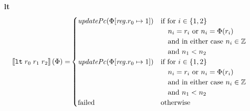 \documentclass[a4paper]{article}
\newcommand{\sem}[1]{\left\llbracket #1 \right\rrbracket}
\newcommand{\targetcolor}[1]{\color{black}}
\newcommand{\trg}[1]{{\targetcolor{} #1}}
\newcommand{\zinstr}[1]{\texttt{#1}}
\newcommand{\threeinstr}[4]{
  \ifthenelse{\equal{#2#3#4}{}}
  {\zinstr{#1}}
  {\zinstr{#1} \; #2 \; #3 \; #4}
}
\newcommand{\tlt}[3]{\threeinstr{\trg{lt}}{#1}{#2}{#3}}
\newcommand{\ints}{\mathbb{Z}}
\newcommand{\update}[2]{[#1 \mapsto #2]}
\newcommand{\updReg}[2]{\update{\reg.#1}{#2}}
\newcommand{\failed}{\mathrm{failed}}
\newcommand{\var}[1]{\mathit{#1}}
\newcommand{\reg}{\var{reg}}
\newcommand{\plainfun}[2]{
  \ifthenelse{\equal{#2}{}}
  {\mathit{#1}}
  {\mathit{#1}(#2)}
}
\newcommand{\updPcAddr}[1]{\plainfun{updatePc}{#1}}
\begin{document}
\noindent\textbf{lt}\\
\begin{align*}
  \sem{\tlt{r_0}{r_1}{r_2}}(\Phi) = &
                                                  \begin{cases}
                                                    \updPcAddr{\Phi\updReg{r_0}{1}} &
                                                    \arraycolsep=0pt
                                                    \begin{array}[t]{l}
                                                      \text{if for $i \in \{1,2\}$}\\
                                                      \quad\text{$n_i = r_i$ or $n_i = \Phi(r_i)$}\\
                                                      \quad\text{and in either case $n_i \in \ints$}\\
                                                      \quad\text{and $n_1 < n_2$}\\        
                                                    \end{array}\\
                                                    \updPcAddr{\Phi\updReg{r_0}{1}} &
                                                    \arraycolsep=0pt
                                                    \begin{array}[t]{l}
                                                      \text{if for $i \in \{1,2\}$}\\
                                                      \quad\text{$n_i = r_i$ or $n_i = \Phi(r_i)$}\\
                                                      \quad\text{and in either case $n_i \in \ints$}\\
                                                      \quad\text{and $n_1 < n_2$}\\        
                                                    \end{array}\\
                                                    \failed & \text{otherwise}
                                                  \end{cases}  
\end{align*}
\end{document}

